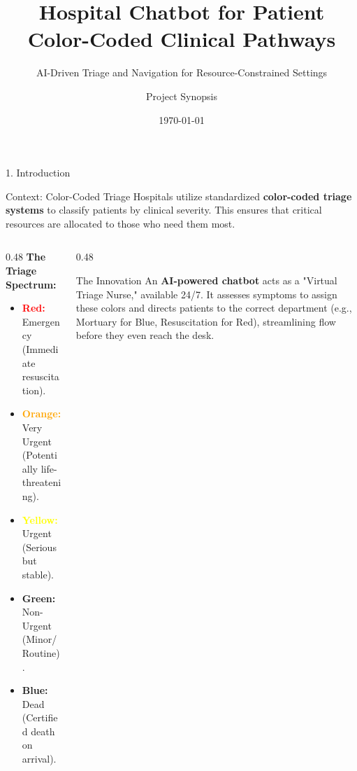 \documentclass[aspectratio=169]{beamer}
\title[Hospital Chatbot]{Hospital Chatbot for Patient Color-Coded Clinical Pathways}
\subtitle{AI-Driven Triage and Navigation for Resource-Constrained Settings}
\author{Project Synopsis}
\institute[]{Department of Mathematics}
\date{\today}
\begin{document}
	
	\begin{frame}
		\titlepage
	\end{frame}
	
	\begin{frame}{1. Introduction}
		\begin{block}{Context: Color-Coded Triage}
			Hospitals utilize standardized \textbf{color-coded triage systems} to classify patients by clinical severity. This ensures that critical resources are allocated to those who need them most.
		\end{block}
		
		\vspace{0.2cm}
		
		\begin{columns}[t]
			\begin{column}{0.48\textwidth}
				\textbf{The Triage Spectrum:}
				\begin{itemize}
					\item \textcolor{red}{\textbf{Red:}} Emergency (Immediate resuscitation).
					\item \textcolor{orange}{\textbf{Orange:}} Very Urgent (Potentially life-threatening).
					\item \textcolor{yellow}{\textbf{Yellow:}} Urgent (Serious but stable).
					\item \textcolor{green_triage}{\textbf{Green:}} Non-Urgent (Minor/Routine).
					\item \textcolor{blue_dead}{\textbf{Blue:}} Dead (Certified death on arrival).
				\end{itemize}
			\end{column}
			\begin{column}{0.48\textwidth}
				\begin{exampleblock}{The Innovation}
					An \textbf{AI-powered chatbot} acts as a "Virtual Triage Nurse," available 24/7. It assesses symptoms to assign these colors and directs patients to the correct department (e.g., Mortuary for Blue, Resuscitation for Red), streamlining flow before they even reach the desk.
				\end{exampleblock}
			\end{column}
		\end{columns}
	\end{frame}
	
\end{document}
